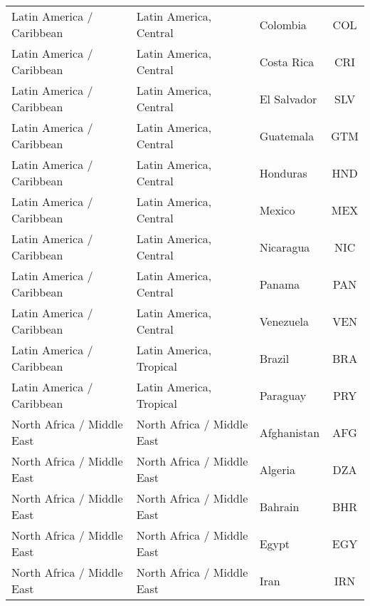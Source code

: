 \begin{longtable}{|p{3cm}|p{3.5cm}|p{5cm}|c|}
     Latin America / Caribbean &       Latin America, Central &                                          Colombia &  COL \\
     Latin America / Caribbean &       Latin America, Central &                                        Costa Rica &  CRI \\
     Latin America / Caribbean &       Latin America, Central &                                       El Salvador &  SLV \\
     Latin America / Caribbean &       Latin America, Central &                                         Guatemala &  GTM \\
     Latin America / Caribbean &       Latin America, Central &                                          Honduras &  HND \\
     Latin America / Caribbean &       Latin America, Central &                                            Mexico &  MEX \\
     Latin America / Caribbean &       Latin America, Central &                                         Nicaragua &  NIC \\
     Latin America / Caribbean &       Latin America, Central &                                            Panama &  PAN \\
     Latin America / Caribbean &       Latin America, Central &                                         Venezuela &  VEN \\
     Latin America / Caribbean &      Latin America, Tropical &                                            Brazil &  BRA \\
     Latin America / Caribbean &      Latin America, Tropical &                                          Paraguay &  PRY \\
    North Africa / Middle East &   North Africa / Middle East &                                       Afghanistan &  AFG \\
    North Africa / Middle East &   North Africa / Middle East &                                           Algeria &  DZA \\
    North Africa / Middle East &   North Africa / Middle East &                                           Bahrain &  BHR \\
    North Africa / Middle East &   North Africa / Middle East &                                             Egypt &  EGY \\
    North Africa / Middle East &   North Africa / Middle East &                                              Iran &  IRN \\

\end{longtable}
